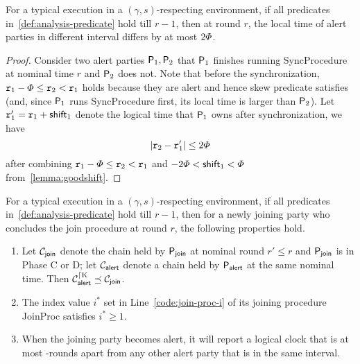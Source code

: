 \begin{lemma} \label{lemma:goodskew-different-interval}
    For a typical execution in a $(\gamma, s)$-respecting environment, if all predicates in~\cref{def:analysis-predicate} hold till $r - 1$, then at round $r$, the local time of alert parties in different interval differs by at most $2\varPhi$.
\end{lemma}

\begin{proof}
    Consider two alert parties $\mathsf{P}_1, \mathsf{P}_2$ that $\mathsf{P}_1$ finishes running \textsf{SyncProcedure} at nominal time $r$ and $\mathsf{P}_2$ does not.
    Note that before the synchronization, $\mathtt{r}_1 - \varPhi \le \mathtt{r}_2 < \mathtt{r}_1$ holds because they are alert and hence skew predicate satisfies (and, since $\mathsf{P}_1$ runs \textsf{SyncProcedure} first, its local time is larger than $\mathsf{P}_2$).
    Let $\mathtt{r}'_1 = \mathtt{r}_1 + \mathsf{shift}_1$ denote the logical time that $\mathsf{P}_1$ owns after synchronization, we have
    \[ |\mathtt{r}_2 - \mathtt{r}'_1| \le 2\varPhi \]
    after combining $\mathtt{r}_1 - \varPhi \le \mathtt{r}_2 < \mathtt{r}_1$ and $-2\varPhi < \mathsf{shift}_1 < \varPhi$ from~\cref{lemma:goodshift}.
\end{proof}

\begin{lemma} \label{lemma:goodskew-new-party}
    For a typical execution in a $(\gamma, s)$-respecting environment, if all predicates in~\cref{def:analysis-predicate} hold till $r - 1$, then for a newly joining party who concludes the join procedure at round $r$, the following properties hold.
    \begin{enumerate}[label=(\alph*), leftmargin=*, nosep]
        \item Let $\mathcal{C}_{\mathsf{join}}$ denote the chain held by $\mathsf{P}_{\mathsf{join}}$ at nominal round $r' \le r$ and $\mathsf{P}_{\mathsf{join}}$ is in Phase C or D; let $\mathcal{C}_{\mathsf{alert}}$ denote a chain held by $\mathsf{P}_{\mathsf{alert}}$ at the same nominal time.
              Then $\mathcal{C}_{\mathsf{alert}}^{\lceil \mathrm{K}} \preceq \mathcal{C}_{\mathsf{join}}$.

        \item The index value $i^*$ set in Line~\ref{code:join-proc-i} of its joining procedure \textsf{JoinProc} satisfies $i^* \ge 1$.

        \item When the joining party becomes alert, it will report a logical clock that is at most \maxskew-rounds apart from any other alert party that is in the same interval.
    \end{enumerate}
\end{lemma}

